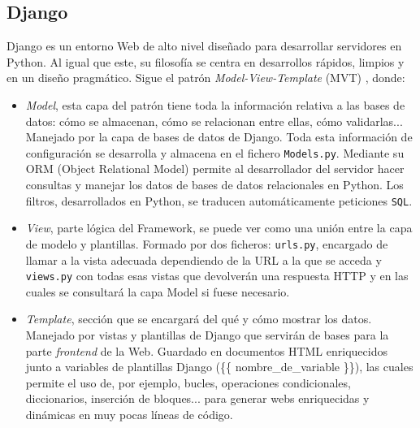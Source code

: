 \documentclass[a4paper, 12pt]{book}
\begin{document}
	\subsection{Django}
	\label{subsec:django}
		Django es un entorno Web de alto nivel diseñado para desarrollar servidores en Python. Al igual que este, su filosofía se centra en desarrollos rápidos, limpios y en un diseño pragmático. Sigue el patrón \textit{Model-View-Template} (MVT) \cite{Django MVC}, donde:
		
		\begin{itemize}
			\item \textit{Model}, esta capa del patrón tiene toda la información relativa a las bases de datos: cómo se almacenan, cómo se relacionan entre ellas, cómo validarlas... Manejado por la capa de bases de datos de Django. Toda esta información de configuración se desarrolla y almacena en el fichero \texttt{Models.py}. Mediante su ORM (Object Relational Model) permite al desarrollador del servidor hacer consultas y manejar los datos de bases de datos relacionales en Python. Los filtros, desarrollados en Python, se traducen automáticamente peticiones \texttt{SQL}.
			
			\item \textit{View}, parte lógica del Framework, se puede ver como una unión entre la capa de modelo y plantillas. Formado por dos ficheros: \texttt{urls.py}, encargado de llamar a la vista adecuada dependiendo de la URL a la que se acceda y \texttt{views.py} con todas esas vistas que devolverán una respuesta HTTP y en las cuales se consultará la capa Model si fuese necesario.
			
			
			\item \textit{Template}, sección que se encargará del qué y cómo mostrar los datos. Manejado por vistas y plantillas de Django que servirán de bases para la parte \textit{frontend} de la Web. Guardado en documentos HTML enriquecidos junto a variables de plantillas Django (\{\{ nombre\_de\_variable \}\}), las cuales permite el uso de, por ejemplo, bucles, operaciones condicionales, diccionarios, inserción de bloques... para generar webs enriquecidas y dinámicas en muy pocas líneas de código.
			
		\end{itemize}
\end{document}
